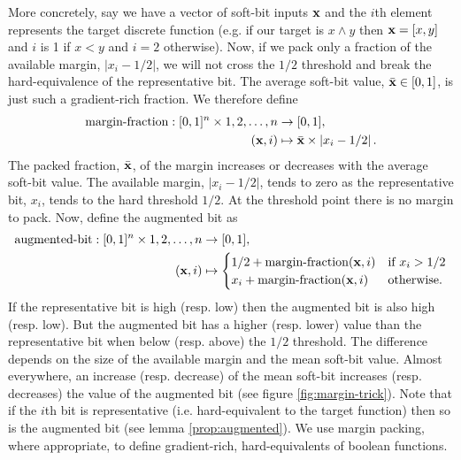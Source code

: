 \documentclass{article} %
\begin{document}
More concretely, say we have a vector of soft-bit inputs ${\bf x}$ and the $i$th element represents the target discrete function (e.g. if our target is $x \wedge y$ then ${\bf x}=[x,y]$ and $i$ is 1 if $x<y$ and $i=2$ otherwise). Now, if we pack only a fraction of the available margin, $|x_{i}-1/2|$, we will not cross the $1/2$ threshold and break the hard-equivalence of the representative bit. The average soft-bit value, $\bar{\bf x} \in [0,1]$, is just such a gradient-rich fraction. We therefore define 
\begin{equation*}
\begin{aligned}
\operatorname{margin-fraction}: [0,1]^{n} \times 1,2,\dots,n &\to [0,1],\\
({\bf x}, i) &\mapsto \bar{\bf x} \times \left|x_{i} - 1/2\right| \text{.}
\end{aligned}
\end{equation*}
The packed fraction, $\bar{\bf x}$, of the margin increases or decreases with the average soft-bit value. The available margin, $\left|x_{i} - 1/2\right|$, tends to zero as the representative bit, $x_{i}$, tends to the hard threshold $1/2$. At the threshold point there is no margin to pack. Now, define the augmented bit as
\begin{equation}
\begin{aligned}
\operatorname{augmented-bit}: [0,1]^{n} \times 1,2,\dots,n &\to [0,1],\\
({\bf x}, i) &\mapsto 
\begin{cases}
1/2 + \operatorname{margin-fraction}({\bf x}, i) & \text{if } x_{i} > 1/2 \\
x_{i} + \operatorname{margin-fraction}({\bf x}, i) & \text{otherwise.}
\end{cases}
\end{aligned}
\label{eq:augmented-bit}
\end{equation}
If the representative bit is high (resp. low) then the augmented bit is also high (resp. low). 
But the augmented bit has a higher (resp. lower) value than the representative bit when below (resp. above) the $1/2$ threshold. The difference depends on the size of the available margin and the mean soft-bit value. Almost everywhere, an increase (resp. decrease) of the mean soft-bit increases (resp. decreases) the value of the augmented bit (see figure \ref{fig:margin-trick}). Note that if the $i$th bit is representative (i.e. hard-equivalent to the target function) then so is the augmented bit (see lemma \ref{prop:augmented}). We use margin packing, where appropriate, to define gradient-rich, hard-equivalents of boolean functions.
\end{document}
